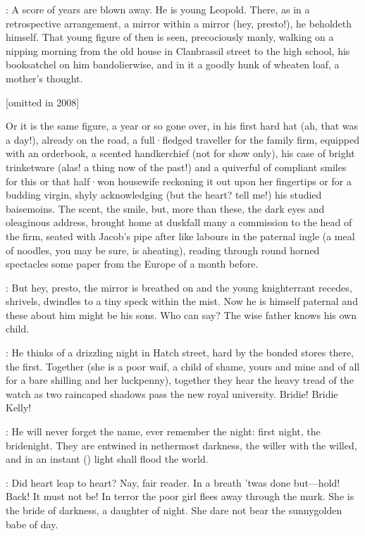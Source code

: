 :
A score of years are blown away.
He is young Leopold.
There,
as in a retrospective arrangement,
a mirror within a
mirror
(hey,
presto!),
he beholdeth himself.
That young figure of then is
seen,
precociously manly,
walking on a nipping morning from the old house
in Clanbrassil street to the high school,
his booksatchel on him
bandolierwise,
and in it a goodly hunk of wheaten loaf,
a mother's
thought.

[omitted in 2008]

Or it is the same figure,
a year or so gone over,
in his first
hard hat
(ah,
that was a day!),
already on the road,
a full·fledged traveller for the family firm,
equipped with an orderbook,
a scented
handkerchief
(not for show only),
his case of bright trinketware
(alas!
a thing now of the past!)
and a quiverful of compliant smiles for this or
that half·won housewife reckoning it out upon her fingertips or for a budding virgin,
shyly acknowledging
(but the heart?
tell me!)
his studied baisemoins.
The scent,
the smile,
but,
more than these,
the dark eyes and
oleaginous address,
brought home at duskfall many a commission to the
head of the firm,
seated with Jacob's pipe after like labours in the
paternal ingle
(a meal of noodles,
you may be sure,
is aheating),
reading through round horned spectacles some paper from the Europe of a month
before.

:
But hey,
presto,
the mirror is breathed on and the young
knighterrant recedes,
shrivels,
dwindles to a tiny speck within the mist.
Now he is himself paternal and these about him might be his sons.
Who can
say?
The wise father knows his own child.

:
He thinks of a drizzling night in Hatch street,
hard by the bonded
stores there,
the first.
Together
(she is a poor waif,
a child of shame,
yours and mine and of all for a bare shilling and her luckpenny),
together
they hear the heavy tread of the watch as two raincaped shadows pass the
new royal university.
Bridie!
Bridie Kelly!

:
He will never forget the name,
ever remember the night:
first night,
the bridenight.
They are entwined in nethermost darkness,
the willer with the willed,
and in an instant
()
light shall flood the world.

:
Did heart leap to heart?
Nay,
fair reader.
In a breath 'twas
done but---hold!
Back!
It must not be!
In terror the poor girl flees away
through the murk.
She is the bride of darkness,
a daughter of night.
She
dare not bear the sunnygolden babe of day.

